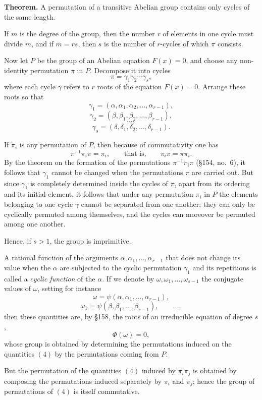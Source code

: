\documentclass[11pt,a4paper]{book}
\begin{document}
\medskip
\noindent\textbf{Theorem.}
A permutation of a transitive Abelian group contains only cycles of the same length.

\medskip
If $m$ is the degree of the group, then the number $r$ of elements in one cycle must divide $m$, and if $m = rs$, then $s$ is the number of $r$-cycles of which $\pi$ consists.

Now let $P$ be the group of an Abelian equation $F(x)=0$, and choose any non-identity permutation $\pi$ in $P$. Decompose it into cycles
\[
\pi = \gamma_1\gamma_2\cdots\gamma_s,
\tag{1}
\]
where each cycle $\gamma$ refers to $r$ roots of the equation $F(x)=0$. Arrange these roots so that
\[
\gamma_1=(\alpha,\alpha_1,\alpha_2,\dots,\alpha_{r-1}),
\]
\[
\gamma_2=(\beta,\beta_1,\beta_2,\dots,\beta_{r-1}),
\]
\[
\dots,
\]
\[
\gamma_s=(\delta,\delta_1,\delta_2,\dots,\delta_{r-1}).
\tag{2}
\]

If $\pi_i$ is any permutation of $P$, then because of commutativity one has
\[
\pi^{-1}\pi_i\pi=\pi_i,
\qquad\text{that is,}\qquad
\pi_i\pi=\pi\pi_i.
\tag{3}
\]
By the theorem on the formation of the permutations $\pi^{-1}\pi_i\pi$ (\S 154, no.\ 6), it follows that $\gamma_1$ cannot be changed when the permutations $\pi$ are carried out. But since $\gamma_1$ is completely determined inside the cycles of $\pi$, apart from its ordering and its initial element, it follows that under any permutation $\pi_i$ in $P$ the elements belonging to one cycle $\gamma$ cannot be separated from one another; they can only be cyclically permuted among themselves, and the cycles can moreover be permuted among one another.

Hence, if $s>1$, the group is imprimitive.

A rational function of the arguments $\alpha,\alpha_1,\dots,\alpha_{r-1}$ that does not change its value when the $\alpha$ are subjected to the cyclic permutation $\gamma_1$ and its repetitions is called a \emph{cyclic function} of the $\alpha$. If we denote by $\omega,\omega_1,\dots,\omega_{s-1}$ the conjugate values of $\omega$, setting for instance
\[
\omega=\psi(\alpha,\alpha_1,\dots,\alpha_{r-1}),
\]
\[
\omega_1=\psi(\beta,\beta_1,\dots,\beta_{r-1}),
\qquad\dots,
\tag{4}
\]
then these quantities are, by \S 158, the roots of an irreducible equation of degree $s$,
\[
\Phi(\omega)=0,
\tag{5}
\]
whose group is obtained by determining the permutations induced on the quantities \((4)\) by the permutations coming from $P$.

But the permutation of the quantities \((4)\) induced by $\pi_i\pi_j$ is obtained by composing the permutations induced separately by $\pi_i$ and $\pi_j$; hence the group of permutations of \((4)\) is itself commutative.
\end{document}
